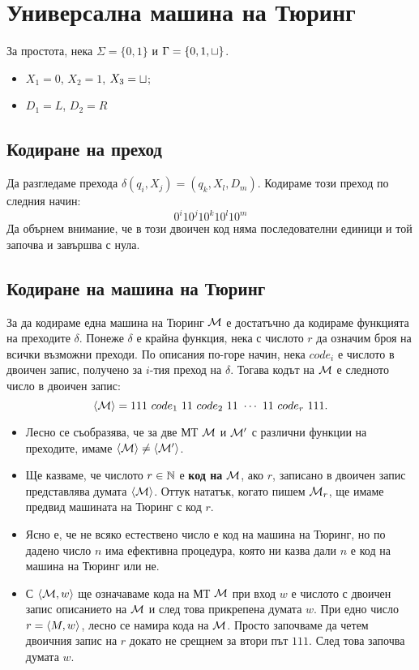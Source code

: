 \section{Универсална машина на Тюринг}
За простота, нека $\Sigma = \{0,1\}$ и $\Gamma = \{0,1,\sqcup\}$.
\begin{itemize}
\item 
  $X_1 = 0$, $X_2 = 1$, $X_3 = \sqcup$;
\item
  $D_1 = L$, $D_2 = R$
\end{itemize}

\subsection*{Кодиране на преход}
Да разгледаме прехода $\delta(q_i,X_j) = (q_k,X_l,D_m)$.
Кодираме този преход по следния начин:
\[0^i10^j10^k10^l10^m\]
Да обърнем внимание, че в този двоичен код няма последователни единици и той 
започва и завършва с нула.
\subsection*{Кодиране на машина на Тюринг}
За да кодираме една машина на Тюринг $\mathcal{M}$ е достатъчно да кодираме функцията на преходите $\delta$.
Понеже $\delta$ е крайна функция, нека с числото $r$ да означим броя на всички възможни преходи.
По описания по-горе начин, нека $code_i$ е числото в двоичен запис, получено за $i$-тия преход на $\delta$.
Тогава кодът на $\mathcal{M}$ е следното число в двоичен запис:
\[\pair{\M} = 111\ code_1\ 11\ code_2\ 11\ \cdots\ 11\ code_r\ 111.\]
\begin{itemize}
\item
  Лесно се съобразява, че за две МТ $\mathcal{M}$ и $\mathcal{M}'$ с различни функции на преходите, имаме $\langle{\mathcal{M}}\rangle \neq \langle{\mathcal{M}'}\rangle$.
\item
  Ще казваме, че числото $r\in\mathbb{N}$ е {\bf код на} $\mathcal{M}$, ако $r$, записано в двоичен запис представлява думата $\langle{\mathcal{M}}\rangle$.
  Оттук нататък, когато пишем $\mathcal{M}_r$, ще имаме предвид машината на Тюринг с код $r$.
\item
  Ясно е, че не всяко естествено число е код на машина на Тюринг, но по дадено число $n$
  има ефективна процедура, която ни казва дали $n$ е код на машина на Тюринг или не.
\item
  С $\langle{\mathcal{M},w}\rangle$ ще означаваме кода на МТ $\mathcal{M}$ при вход $w$ е числото с двоичен запис описанието на $\mathcal{M}$ и след това прикрепена думата $w$.
  При едно число $r = \langle{M,w}\rangle$, лесно се намира кода на $\mathcal{M}$.
  Просто започваме да четем двоичния запис на $r$ докато не срещнем за втори път $111$.
  След това започва думата $w$.
\end{itemize}


